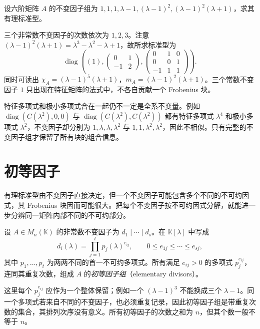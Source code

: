 \begin{example}
\label{ex:xie-rational-six}
设六阶矩阵 $A$ 的不变因子组为 $1,1,1,\lambda-1,(\lambda-1)^2,(\lambda-1)^2(\lambda+1)$，求其有理标准型。
\end{example}
\begin{solve}
三个非常数不变因子的次数依次为 $1,2,3$。注意 $(\lambda-1)^2(\lambda+1)=\lambda^3-\lambda^2-\lambda+1$，故所求标准型为
\[
    \operatorname{diag}\left(
        (1),
        \begin{pmatrix}0&1\\-1&2\end{pmatrix},
        \begin{pmatrix}0&1&0\\0&0&1\\-1&1&1\end{pmatrix}
    \right).
\]
同时可读出 $\chi_A=(\lambda-1)^5(\lambda+1)$，$m_A=(\lambda-1)^2(\lambda+1)$。三个常数不变因子 $1$ 只出现在特征矩阵的法式中，不各自贡献一个 Frobenius 块。
\end{solve}

特征多项式和极小多项式合在一起仍不一定是全系不变量。例如 $\operatorname{diag}(C(\lambda^2),0,0)$ 与 $\operatorname{diag}(C(\lambda^2),C(\lambda^2))$ 都有特征多项式 $\lambda^4$ 和极小多项式 $\lambda^2$，不变因子却分别为 $1,\lambda,\lambda,\lambda^2$ 与 $1,1,\lambda^2,\lambda^2$，因此不相似。只有完整的不变因子组才保留了所有块的组合信息。

\section{初等因子}
\label{sec:xie-elementary-divisors}

有理标准型由不变因子直接决定，但一个不变因子可能包含多个不同的不可约因式，其 Frobenius 块因而可能很大。把每个不变因子按不可约因式分解，就能进一步分辨同一矩阵内部不同的不可约部分。

\begin{definition}
\label{def:xie-elementary-divisors}
设 $A\in M_n(\mathbb K)$ 的非常数不变因子为 $d_1\mid\cdots\mid d_s$。在 $\mathbb K[\lambda]$ 中写成
\[
    d_i(\lambda)=\prod_{j=1}^t p_j(\lambda)^{e_{ij}},
    \qquad 0\le e_{1j}\le\cdots\le e_{sj},
\]
其中 $p_1,\ldots,p_t$ 为两两不同的首一不可约多项式。所有满足 $e_{ij}>0$ 的多项式 $p_j^{e_{ij}}$，连同其重复次数，组成 $A$ 的\emph{初等因子组}（elementary divisors）。
\end{definition}

这里每个 $p_j^{e_{ij}}$ 应作为一个整体保留；例如一个 $(\lambda-1)^3$ 不能换成三个 $\lambda-1$。同一个多项式若来自不同的不变因子，也必须重复记录，因此初等因子组是带重复次数的集合，其排列次序没有意义。所有初等因子的次数之和为 $n$，但其个数一般不等于 $n$。

